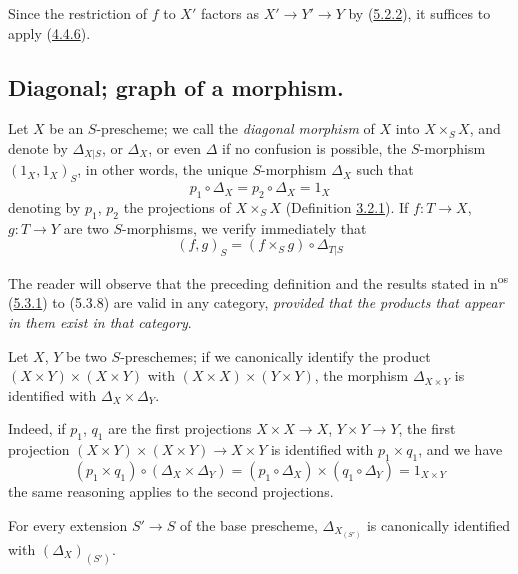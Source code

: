 Since the restriction of $f$ to $X'$ factors as
$X'\to Y'\to Y$ by (\hyperref[I.5.2.2]{5.2.2}), it suffices to apply
(\hyperref[I.4.4.6]{4.4.6}).

\subsection{Diagonal; graph of a morphism.}
\label{subsection:I.5.3}

\begin{env}[5.3.1]
\label{I.5.3.1}
Let $X$ be an $S$-prescheme; we call the \emph{diagonal morphism} of $X$ into
$X\times_S X$, and denote by $\Delta_{X|S}$, or $\Delta_X$, or even $\Delta$ if
no confusion is possible, the $S$-morphism $(1_X,1_X)_S$, in other
words, the unique $S$-morphism $\Delta_X$ such that
\[
  p_1\circ\Delta_X=p_2\circ\Delta_X=1_X
  \tag{5.3.1.1}\label{I.5.3.1.1}
\]
denoting by $p_1$, $p_2$ the projections of $X\times_S X$
(Definition \hyperref[I.3.2.1]{3.2.1}). If $f:T\to X$, $g:T\to Y$ are two
$S$-morphisms, we verify immediately that
\[
  (f,g)_S=(f\times_S g)\circ\Delta_{T|S}
  \tag{5.3.1.2}\label{I.5.3.1.2}
\]

The reader will observe that the preceding definition and the results stated
in n\textsuperscript{os} (\hyperref[I.5.3.1]{5.3.1}) to (5.3.8) are
valid in any category, \emph{provided that the products that appear in them
exist in that category}.
\end{env}

\begin{proposition}[5.3.2]
\label{I.5.3.2}
Let $X$, $Y$ be two $S$-preschemes; if we canonically identify the product
$(X\times Y)\times(X\times Y)$ with $(X\times X)\times(Y\times Y)$, the morphism
$\Delta_{X\times Y}$ is identified with $\Delta_X\times\Delta_Y$.
\end{proposition}

Indeed, if $p_1$, $q_1$ are the first projections
$X\times X\to X$, $Y\times Y\to Y$, the first projection
$(X\times Y)\times(X\times Y)\to X\times Y$ is identified with $p_1\times q_1$,
and we have
\[
  (p_1\times q_1)\circ(\Delta_X\times\Delta_Y)
  =(p_1\circ\Delta_X)\times(q_1\circ\Delta_Y)=1_{X\times Y}
\]
the same reasoning applies to the second projections.

\begin{corollary}[5.3.4]
\label{I.5.3.4}
For every extension $S'\to S$ of the base prescheme,
$\Delta_{X_{(S')}}$ is canonically identified with $(\Delta_X)_{(S')}$.
\end{corollary}

